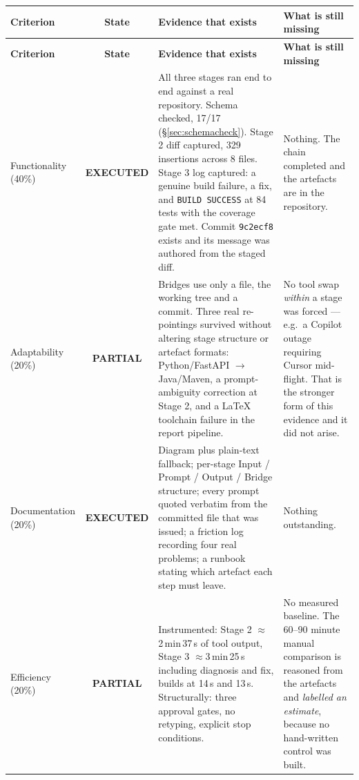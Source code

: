 \documentclass[11pt,a4paper]{article}
\newcommand{\code}[1]{\texttt{\small #1}}
\newcommand{\ran}{\textcolor{good}{\textbf{EXECUTED}}}
\newcommand{\partly}{\textcolor{warn}{\textbf{PARTIAL}}}
\begin{document}
\begin{longtable}{@{}L{2.5cm} c L{5.0cm} L{4.6cm}@{}}
\toprule
\textbf{Criterion} & \textbf{State} & \textbf{Evidence that exists} & \textbf{What is still missing} \\
\midrule
\endfirsthead
\toprule
\textbf{Criterion} & \textbf{State} & \textbf{Evidence that exists} & \textbf{What is still missing} \\
\midrule
\endhead
\bottomrule
\endfoot
Functionality (40\%)
  & \ran
  & All three stages ran end to end against a real repository. Schema checked,
    17/17 (\S\ref{sec:schemacheck}). Stage 2 diff captured, 329 insertions
    across 8 files. Stage 3 log captured: a genuine build failure, a fix, and
    \code{BUILD SUCCESS} at 84 tests with the coverage gate met. Commit
    \code{9c2ecf8} exists and its message was authored from the staged diff.
  & Nothing. The chain completed and the artefacts are in the repository. \\
\addlinespace
Adaptability (20\%)
  & \partly
  & Bridges use only a file, the working tree and a commit. Three real
    re-pointings survived without altering stage structure or artefact
    formats: Python/FastAPI $\rightarrow$ Java/Maven, a prompt-ambiguity
    correction at Stage 2, and a LaTeX toolchain failure in the report
    pipeline.
  & No tool swap \emph{within} a stage was forced --- e.g.\ a Copilot outage
    requiring Cursor mid-flight. That is the stronger form of this evidence and
    it did not arise. \\
\addlinespace
Documentation (20\%)
  & \ran
  & Diagram plus plain-text fallback; per-stage Input / Prompt / Output /
    Bridge structure; every prompt quoted verbatim from the committed file that
    was issued; a friction log recording four real problems; a runbook stating
    which artefact each step must leave.
  & Nothing outstanding. \\
\addlinespace
Efficiency (20\%)
  & \partly
  & Instrumented: Stage 2 $\approx$2\,min\,37\,s of tool output, Stage 3
    $\approx$3\,min\,25\,s including diagnosis and fix, builds at 14\,s and
    13\,s. Structurally: three approval gates, no retyping, explicit stop
    conditions.
  & No measured baseline. The 60--90 minute manual comparison is reasoned from
    the artefacts and \emph{labelled an estimate}, because no hand-written
    control was built. \\
\end{longtable}
\end{document}
